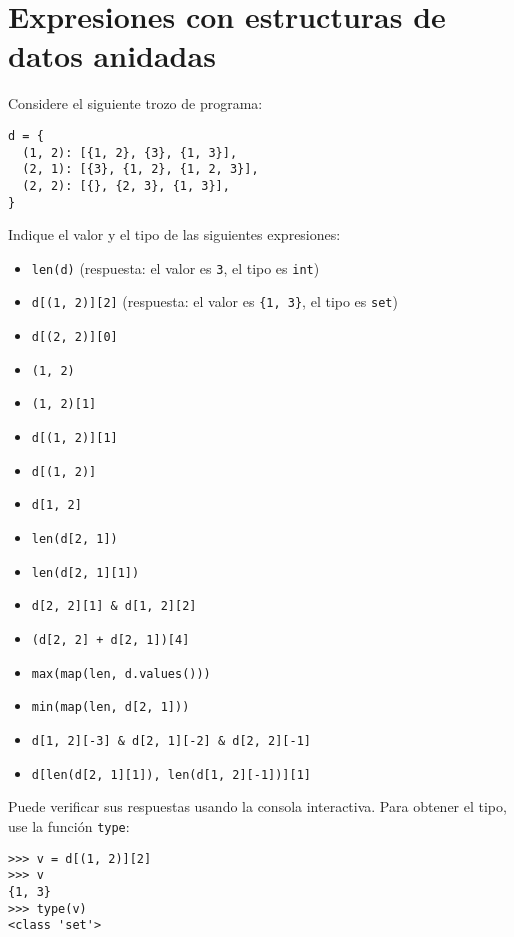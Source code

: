 \section{Expresiones con estructuras de datos anidadas}

Considere el siguiente trozo de programa:
\begin{lstlisting}
d = {
  (1, 2): [{1, 2}, {3}, {1, 3}],
  (2, 1): [{3}, {1, 2}, {1, 2, 3}],
  (2, 2): [{}, {2, 3}, {1, 3}],
}
\end{lstlisting}
Indique el valor y el tipo de las siguientes expresiones:
\begin{itemize}
  \item \lstinline!len(d)!
    (respuesta: el valor es \lstinline!3!,
    el tipo es \lstinline!int!)
  \item \lstinline!d[(1, 2)][2]!
    (respuesta: el valor es \lstinline!{1, 3}!,
    el tipo es \lstinline!set!)
  \item \lstinline!d[(2, 2)][0]!
  \item \lstinline!(1, 2)!
  \item \lstinline!(1, 2)[1]!
  \item \lstinline!d[(1, 2)][1]!
  \item \lstinline!d[(1, 2)]!
  \item \lstinline!d[1, 2]!
  \item \lstinline!len(d[2, 1])!
  \item \lstinline!len(d[2, 1][1])!
  \item \lstinline!d[2, 2][1] & d[1, 2][2]!
  \item \lstinline!(d[2, 2] + d[2, 1])[4]!
  \item \lstinline!max(map(len, d.values()))!
  \item \lstinline!min(map(len, d[2, 1]))!
  \item \lstinline!d[1, 2][-3] & d[2, 1][-2] & d[2, 2][-1]!
  \item \lstinline!d[len(d[2, 1][1]), len(d[1, 2][-1])][1]!
\end{itemize}
Puede verificar sus respuestas usando la consola interactiva. Para
obtener el tipo, use la función \lstinline!type!:
\begin{lstlisting}
>>> v = d[(1, 2)][2]
>>> v
{1, 3}
>>> type(v)
<class 'set'>
\end{lstlisting}


